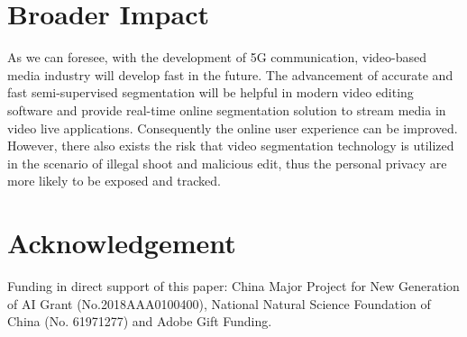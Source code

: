 \documentclass{article}
\begin{document}
\section*{Broader Impact}
 As we can foresee, with the development of 5G communication, video-based media industry will develop fast in the future. The advancement of accurate and fast semi-supervised segmentation will be helpful in modern video editing software and provide real-time online segmentation solution to stream media in video live applications. Consequently the online user experience can be improved. However, there also exists the risk that video segmentation technology is utilized in the scenario of illegal shoot and malicious edit, thus the personal privacy are more likely to be exposed and tracked.

\section*{Acknowledgement}
Funding in direct support of this paper: China Major Project for New Generation of AI Grant (No.2018AAA0100400), National Natural Science Foundation of China (No. 61971277) and Adobe Gift Funding.
\end{document}
